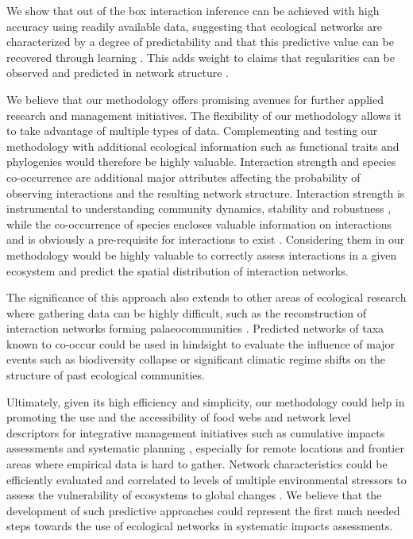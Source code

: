 We show that out of the box interaction inference can be achieved with high accuracy using readily available data, suggesting that ecological networks are characterized by a degree of predictability and that this predictive value can be recovered through learning \cite[see ][]{tamaddoni-nezhad2013, gray2015}. This adds weight to claims that regularities can be observed and predicted in network structure \citep{eklof2016}.

We believe that our methodology offers promising avenues for further applied research and management initiatives. The flexibility of our methodology allows it to take advantage of multiple types of data. Complementing and testing our methodology with additional ecological information such as functional traits and phylogenies would therefore be highly valuable. Interaction strength and species co-occurrence are additional major attributes affecting the probability of observing interactions and the resulting network structure. Interaction strength is instrumental to understanding community dynamics, stability and robustness \citep{laska1998, morales-castilla2015}, while the co-occurrence of species encloses valuable information on interactions and is obviously a pre-requisite for interactions to exist \citep{cazelles2016}. Considering them in our methodology would be highly valuable to correctly assess interactions in a given ecosystem and predict the spatial distribution of interaction networks.

The significance of this approach also extends to other areas of ecological research where gathering data can be highly difficult, such as the reconstruction of interaction networks forming palaeocommunities \citep[e.g.][]{yeakel2013, yeakel2014}. Predicted networks of taxa known to co-occur could be used in hindsight to evaluate the influence of major events such as biodiversity collapse or significant climatic regime shifts on the structure of past ecological communities.

Ultimately, given its high efficiency and simplicity, our methodology could help in promoting the use and the accessibility of food webs and network level descriptors for integrative management initiatives such as cumulative impacts assessments and systematic planning \citep{giakoumi2015, beauchesne2016}, especially for remote locations and frontier areas where empirical data is hard to gather. Network characteristics could be efficiently evaluated and correlated to levels of multiple environmental stressors to assess the vulnerability of ecosystems to global changes \citep{albouy2014}. We believe that the development of such predictive approaches could represent the first much needed steps towards the use of ecological networks in systematic impacts assessments.

